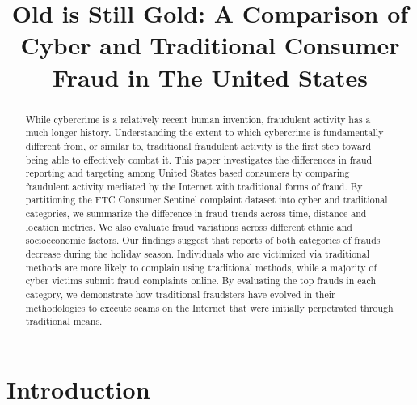 \documentclass[conference]{IEEEtran}
\begin{document}
\title{Old is Still Gold: A Comparison of Cyber and Traditional Consumer Fraud in The United States}


\author{
}

\maketitle

\begin{abstract}

While cybercrime is a relatively recent human invention, fraudulent activity
has a much longer history. Understanding the extent to which cybercrime is fundamentally different from, or similar to, traditional fraudulent activity is the first step toward being able to effectively combat it. This paper investigates the differences in fraud
reporting and targeting among United States based consumers by comparing
fraudulent activity mediated by the Internet with traditional forms of
fraud. By partitioning the FTC Consumer Sentinel complaint dataset into
cyber and traditional categories, we summarize the difference in fraud
trends across time, distance and location metrics. We also evaluate fraud
variations across different ethnic and socioeconomic factors. Our findings
suggest that reports of both categories of frauds decrease during
the holiday season. Individuals who are victimized via traditional methods
are more likely to complain using traditional methods, while a majority of
cyber victims submit fraud complaints online. By evaluating the top frauds
in each category, we demonstrate how traditional fraudsters have evolved in
their methodologies to execute scams on the Internet that were initially
perpetrated through traditional means.

\end{abstract}

\section{Introduction}
\end{document}
